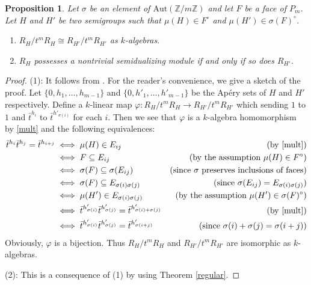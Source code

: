 \documentclass{amsart}
\theoremstyle{plain}
\newtheorem{prop}[theorem]{Proposition}
\theoremstyle{definition}
\numberwithin{theorem}{section}
\numberwithin{equation}{section}
\numberwithin{equation}{theorem}
\begin{document}
\begin{prop}
\label{kunz2.3}
Let $\sigma$ be an element of $\mathrm{Aut}(\mathbb{Z}/m\mathbb{Z})$ and let $F$ be a face of $P_m$.
Let $H$ and $H'$ be two semigroups such that $\mu(H)\in F^{\circ}$ and $\mu(H')\in \sigma(F)^{\circ}$.
\begin{enumerate}[ \rm (1)]
\item $R_H/t^mR_H \cong R_{H'}/t^mR_{H'}$ as $k$-algebras.
\item $R_H$ possesses a nontrivial semidualizing module if and only if so does $R_{H'}$.
\end{enumerate}
\end{prop}

\begin{proof}
(1): It follows from \cite[Proposition 2.3]{K}. %
For the reader's convenience, we give a sketch of the proof.
Let $\{0,h_1,\dots,h_{m-1}\}$ and $\{0,h'_1,\dots,h'_{m-1}\}$ be the Ap\'ery sets of $H$ and $H'$ respectively.
Define a $k$-linear map $\varphi\colon R_H/t^mR_H \to R_{H'}/t^mR_{H'}$ which sending $1$ to $1$ and $\bar{t}^{h_i}$ to $\bar{t}^{h'_{\sigma(i)}}$ for each $i$.
Then we see that $\varphi$ is a $k$-algebra homomorphism by \eqref{mult} and the following equivalences:
\begin{align*}
\bar{t}^{h_i}\bar{t}^{h_j}=\bar{t}^{h_{i+j}} & \iff \mu(H)\in E_{ij} & (\text{by \eqref{mult}})\\
& \iff F \subseteq E_{ij} & (\text{by the assumption } \mu(H)\in F^{\circ})\\
& \iff \sigma(F)\subseteq \sigma(E_{ij}) & (\text{since $\sigma$ preserves inclusions of faces})\\
& \iff \sigma(F)\subseteq E_{\sigma(i)\sigma(j)} & (\text{since $\sigma(E_{ij})=E_{\sigma(i)\sigma(j)}$})\\
& \iff \mu(H') \in E_{\sigma(i)\sigma(j)}
& (\text{by the assumption } \mu(H')\in \sigma (F)^{\circ})\\
& \iff \bar{t}^{h'_{\sigma(i)}}\bar{t}^{h'_{\sigma(j)}}=\bar{t}^{h'_{\sigma(i)+\sigma(j)}} & (\text{by \eqref{mult}})\\
& \iff\bar{t}^{h'_{\sigma(i)}}\bar{t}^{h'_{\sigma(j)}}=\bar{t}^{h'_{\sigma(i+j)}} & (\text{since }\sigma(i)+\sigma(j)=\sigma(i+j))
\end{align*}
Obviously, $\varphi$ is a bijection.
Thus $R_H/t^mR_H$ and $R_{H'}/t^mR_{H'}$ are isomorphic as $k$-algebras.

(2): This is a consequence of (1) by using Theorem \ref{regular}.
\end{proof}
\end{document}
